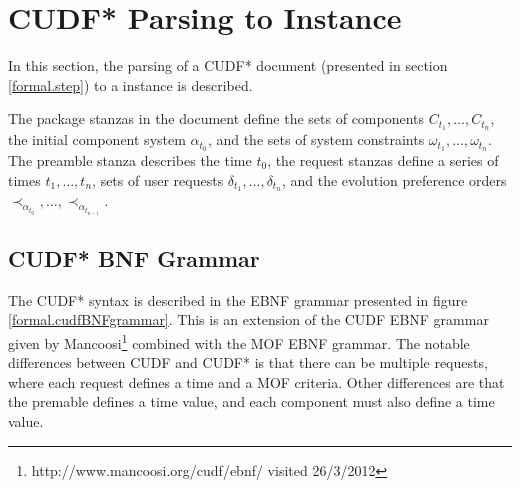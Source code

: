 \appendix{}

\chapter{CUDF* Parsing to \modelname Instance}
\label{apx.cudf}
In this section, the parsing of a CUDF* document (presented in section \ref{formal.step}) to a \modelname instance is described.

The package stanzas in the document define the sets of components $C_{t_1},\ldots,C_{t_n}$, the initial component system $\alpha_{t_0}$, 
and the sets of system constraints $\omega_{t_1},\ldots,\omega_{t_n}$.
The preamble stanza describes the time $t_0$, the request stanzas define a series of times $t_1,\ldots,t_n$, sets of user requests $\delta_{t_1},\ldots,\delta_{t_n}$,
and the evolution preference orders $\prec_{\alpha_{t_0}},\ldots, \prec_{\alpha_{t_{n-1}}}$.

\section{CUDF* BNF Grammar}
The CUDF* syntax is described in the EBNF grammar presented in figure \ref{formal.cudfBNFgrammar}.
This is an extension of the CUDF EBNF grammar given by Mancoosi\footnote{http://www.mancoosi.org/cudf/ebnf/ visited 26/3/2012}
combined with the MOF EBNF grammar.
The notable differences between CUDF and CUDF* is that there can be multiple requests, where each request defines a time and a MOF criteria.
Other differences are that the premable defines a time value,  
and each component must also define a time value.

